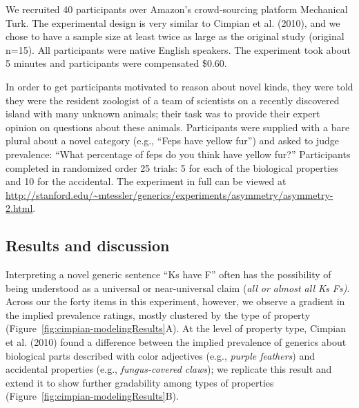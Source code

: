 \documentclass[floatsintext,doc]{apa6}
\begin{document}
We recruited 40 participants over Amazon's crowd-sourcing platform Mechanical Turk.
The experimental design is very similar to Cimpian et al. (2010), and we chose to have a sample size at least twice as large as the original study (original n=15).
All participants were native English speakers.
The experiment took about 5 minutes and participants were compensated \$0.60.


In order to get participants motivated to reason about novel kinds, they were told they were the resident zoologist of a team of scientists on a recently discovered island with many unknown animals; their task was to provide their expert opinion on questions about these animals.
Participants were supplied with a bare plural about a novel category (e.g., \enquote{Feps have yellow fur}) and asked to judge prevalence: \enquote{What percentage of feps do you think have yellow fur?}
Participants completed in randomized order 25 trials: 5 for each of the biological properties and 10 for the accidental.
The experiment in full can be viewed at \url{http://stanford.edu/~mtessler/generics/experiments/asymmetry/asymmetry-2.html}.

\hypertarget{results-and-discussion}{%
\subsection{Results and discussion}\label{results-and-discussion}}

Interpreting a novel generic sentence \enquote{Ks have F} often has the possibility of being understood as a universal or near-universal claim (\emph{all or almost all Ks Fs)}.
Across our the forty items in this experiment, however, we observe a gradient in the implied prevalence ratings, mostly clustered by the type of property (Figure~\ref{fig:cimpian-modelingResults}A).
At the level of property type, Cimpian et al. (2010) found a difference between the implied prevalence of generics about biological parts described with color adjectives (e.g., \emph{purple feathers}) and accidental properties (e.g., \emph{fungus-covered claws});  we replicate this result and extend it to show further gradability among types of properties (Figure~\ref{fig:cimpian-modelingResults}B).
\end{document}
